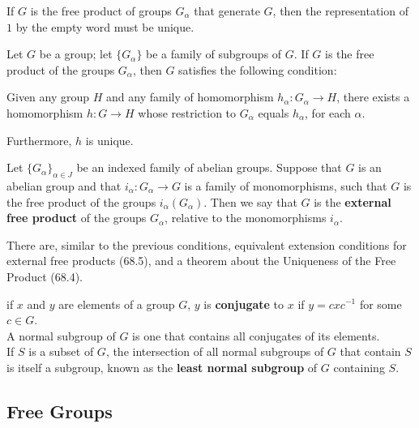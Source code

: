 \begin{remark}
If $G$ is the free product of groups $G_\alpha$ that generate $G$, then the representation of $1$ by the empty word must be unique.
\end{remark}

\begin{lemma}
Let $G$ be a group; let $\{ G_\alpha \}$ be a family of subgroups of $G$. If $G$ is the free product of the groups $G_\alpha$, then $G$ satisfies the following condition: \\ 
    
\begin{addmargin}{1em}
    Given any group $H$ and any family of homomorphism $h_\alpha \colon G_\alpha \rightarrow H$, there exists a homomorphism $h \colon G \rightarrow H$ whose restriction to $G_\alpha$ equals $h_\alpha$, for each $\alpha$. \\
\end{addmargin}

Furthermore, $h$ is unique.
\end{lemma}

\begin{definition}
    Let $\{ G_\alpha \}_{\alpha \in J}$ be an indexed family of abelian groups. Suppose that $G$ is an abelian group and that $i_\alpha \colon G_\alpha \rightarrow G$ is a family of monomorphisms,
    such that $G$ is the free product of the groups $i_\alpha(G_\alpha)$. Then we say that $G$ is the \textbf{external free product} of the groups $G_\alpha$, relative to the monomorphisms $i_\alpha$. 
\end{definition}

There are, similar to the previous conditions, equivalent extension conditions for external free products (68.5), and a theorem about the Uniqueness of the Free Product (68.4).

\begin{definition}
if $x$ and $y$ are elements of a group $G$, $y$ is \textbf{conjugate} to $x$ if $y = cxc^{-1}$ for some $c \in G$. \\

A normal subgroup of $G$ is one that contains all conjugates of its elements. \\

If $S$ is a subset of $G$, the intersection of all normal subgroups of $G$ that contain $S$ is itself a subgroup, known as the \textbf{least normal subgroup} of $G$ containing $S$.
\end{definition}

\subsection{Free Groups}